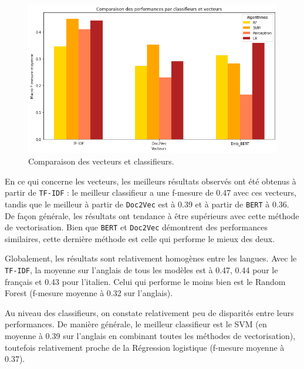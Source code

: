 \begin{figure}[t]
  \includegraphics[width=\columnwidth]{"./assets/comparaison_vecteur_clf_barplot.png"}
  \caption{Comparaison des vecteurs et classifieurs.}
  \label{fig:comparaison_vecteur}
\end{figure}

\par En ce qui concerne les vecteurs, les meilleurs résultats observés ont été obtenus à partir de \texttt{TF-IDF} : le meilleur classifieur a une f-mesure de 0.47 avec ces vecteurs, tandis que le meilleur à partir de \texttt{Doc2Vec} est à 0.39 et à partir de \texttt{BERT} à 0.36. De façon générale, les résultats ont tendance à être supérieurs avec cette méthode de vectorisation. Bien que \texttt{BERT} et \texttt{Doc2Vec} démontrent des performances similaires, cette dernière méthode est celle qui performe le mieux des deux.
\par Globalement, les résultats sont relativement homogènes entre les langues. Avec le \texttt{TF-IDF}, la moyenne sur l'anglais de tous les modèles est à 0.47, 0.44 pour le français et 0.43 pour l'italien. Celui qui performe le moins bien est le Random Forest (f-mesure moyenne à 0.32 sur l'anglais). 
\par Au niveau des classifieurs, on constate relativement peu de disparités entre leurs performances. De manière générale, le meilleur classifieur est le SVM (en moyenne à 0.39 sur l'anglais en combinant toutes les méthodes de vectorisation), toutefois relativement proche de la Régression logistique (f-mesure moyenne à  0.37).